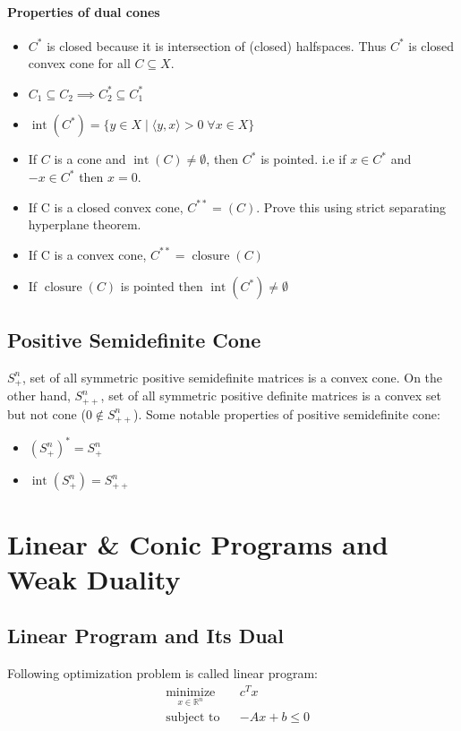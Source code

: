 \documentclass[a4paper,11pt]{article}
\newcommand{\intr}{\operatorname{int}}
\newcommand{\Rn}{\mathbb{R}^n}
\newcommand\inrpd[2]{\langle #1, #2 \rangle}
\begin{document}
\paragraph{Properties of dual cones}
\begin{itemize}
\item $C^*$ is closed because it is intersection of (closed) halfspaces. Thus $C^*$ is closed convex cone for all $C \subseteq X$.
\item $C_1 \subseteq C_2 \implies C_2^* \subseteq C_1^*$ 
\item $\intr(C^*) = \{y \in X \mid \inrpd{y}{x} > 0 \; \forall x \in X \}$
\item If $C$ is a cone and $\intr(C) \neq \emptyset$, then $C^*$ is pointed. i.e if $x \in C^*$ and $-x \in C^*$ then $x = 0$.
\item If C is a closed convex cone, $C^{**} = (C)$. Prove this using strict separating hyperplane theorem.
\item If C is a convex cone, $C^{**} = \operatorname{closure}(C)$
\item If $\operatorname{closure}(C)$ is pointed then $ \intr(C^*) \neq \emptyset$
\end{itemize}

\subsection{Positive Semidefinite Cone}
$S^n_+$, set of all symmetric positive semidefinite matrices is a convex cone. 
On the other hand, $S^n_{++}$, set of all symmetric positive definite matrices is a convex set but not cone ($0 \notin S^n_{++}$). Some notable properties of positive semidefinite cone:
\begin{itemize}
\item $(S^n_+)^* = S^n_+$
\item $\intr(S^n_+) = S^n_{++}$
\end{itemize}

\section{Linear \& Conic Programs and Weak Duality}
\subsection{Linear Program and Its Dual}
Following optimization problem is called linear program:
\begin{equation}
\begin{aligned}
& \underset{x\in \Rn}{\text{minimize}}
& & c^Tx \\
& \text{subject to}
& & -Ax + b \leq 0 
\end{aligned}
\tag{LP}
\end{equation}
\end{document}
